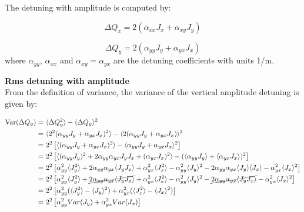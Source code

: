 The detuning with amplitude is computed by:

\begin{equation}\label{eq:x_amplDetuning}
    \Delta Q_x = 2(\alpha_{xx}J_x + \alpha_{xy}J_y)
\end{equation}

\begin{equation}\label{eq:y_amplDetuning}
    \Delta Q_y = 2(\alpha_{yy}J_y + \alpha_{yx}J_x)
\end{equation}
where $\alpha_{yy}$, $\alpha_{xx}$ and $\alpha_{xy}=\alpha_{yx}$ are the detuning coefficients with units 1/m.


\normalsize{\textbf{Rms detuning with amplitude}}\\

From the definition of variance, the variance of the vertical amplitude detuning is given by:

\begin{equation}\label{eq:var_amplDetuning}
    \begin{split}
        \mathrm{Var}(\Delta Q_y) = &~\langle \Delta Q_y ^2 \rangle - \langle \Delta Q_y \rangle ^2 \\
        = &~\langle 2^2 (\alpha_{yy} J_y + \alpha_{yx}J_x)^2 \rangle - \langle 2(\alpha_{yy}J_y + \alpha_{yx}J_x) \rangle^2 \\
        = &~2^2 \left [ \langle (\alpha_{yy} J_y + \alpha_{yx}J_x)^2 \rangle - \langle \alpha_{yy}J_y + \alpha_{yx}J_x \rangle^2 \right ] \\
         = &~2^2 \left [  \langle (\alpha_{yy} J_y)^2 + 2\alpha_{yy}\alpha_{yx}J_yJ_x + (\alpha_{yx} J_x)^2  \rangle - (\langle \alpha_{yy}J_y \rangle + \langle \alpha_{yx}J_x \rangle )^2 \right ]\\
         =&~2^2\left [ \alpha_{yy}^2 \langle J_y^2 \rangle + 2\alpha_{yy}\alpha_{yx} \langle J_yJ_x \rangle + \alpha_{yx}^2 \langle J_x^2 \rangle -\alpha_{yy}^2  \langle J_y \rangle^2 - 2\alpha_{yy} \alpha_{yx} \langle J_y \rangle \langle J_x \rangle - \alpha_{yx} ^2 \langle J_x \rangle^2 \right ]\\
         =&~2^2\left [ \alpha_{yy}^2 \langle J_y^2 \rangle + \cancel{2\alpha_{yy}\alpha_{yx} \langle J_yJ_x \rangle} + \alpha_{yx}^2 \langle J_x^2 \rangle -\alpha_{yy}^2  \langle J_y \rangle^2 - \cancel{2\alpha_{yy} \alpha_{yx} \langle J_y J_x \rangle} - \alpha_{yx} ^2 \langle J_x \rangle^2 \right ]\\
         =&~2^2\left [ \alpha_{yy}^2(\langle J_y^2\rangle - \langle J_y \rangle^2 ) + \alpha_{yx}^2(\langle J_x^2\rangle - \langle J_x \rangle^2 ) \right ]\\
         =&~2^2\left [ \alpha_{yy}^2 Var(J_y) + \alpha_{yx}^2 Var(J_x) \right ]
    \end{split}
\end{equation}

